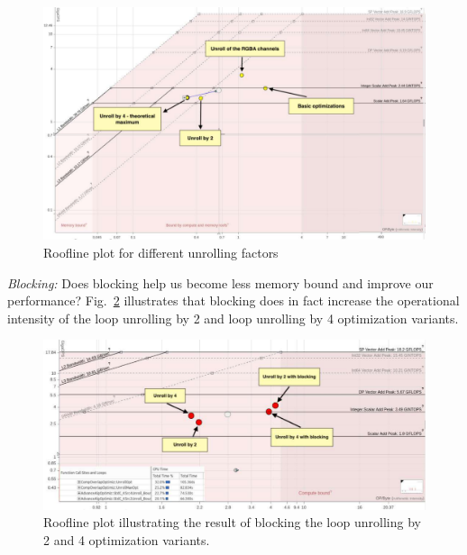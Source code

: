 \documentclass[letterpaper]{article}
\begin{document}
\begin{figure}[htb]
\centering
  \includegraphics[scale=0.25]{RooflineUnroll.pdf}
  \caption{Roofline plot for different unrolling factors
  \label{roofunroll}}
\end{figure}

\textit{Blocking:} Does blocking help us become less memory bound and improve our performance? Fig.~\ref{RooflineBlocking} illustrates that blocking does in fact increase the operational intensity of the loop unrolling by 2 and loop unrolling by 4 optimization variants.

\begin{figure}[htb]
  \centering
    \includegraphics[scale=0.3]{RooflineBlocking.pdf}
    \caption{Roofline plot illustrating the result of blocking the loop unrolling by 2 and 4 optimization variants.
    \label{RooflineBlocking}}
  \end{figure}
\end{document}

